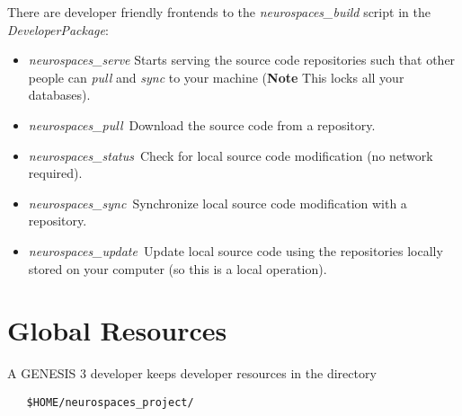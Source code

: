 \documentclass[12pt]{article}
\begin{document}



There are developer friendly frontends to the {\it neurospaces\_build} script in the {\it DeveloperPackage}:
\begin{itemize}
\item[]{\it neurospaces\_serve} Starts serving the source code repositories such that other people can {\it pull} and {\it sync} to your machine ({\bf Note} This locks all your databases).
\item[]{\it neurospaces\_pull}\,\,\,Download the source code from a repository.
\item[]{\it neurospaces\_status}\,\,\,Check for local source code modification (no network required).
\item[]{\it neurospaces\_sync}\,\,\,Synchronize local source code modification with a repository.
\item[]{\it neurospaces\_update}\,\,\,Update local source code using the repositories locally stored on your computer (so this is a local operation). 
\end{itemize}

\section*{Global Resources}

A GENESIS 3 developer keeps developer resources in the directory

\begin{verbatim}
   $HOME/neurospaces_project/
\end{verbatim}
\end{document}
